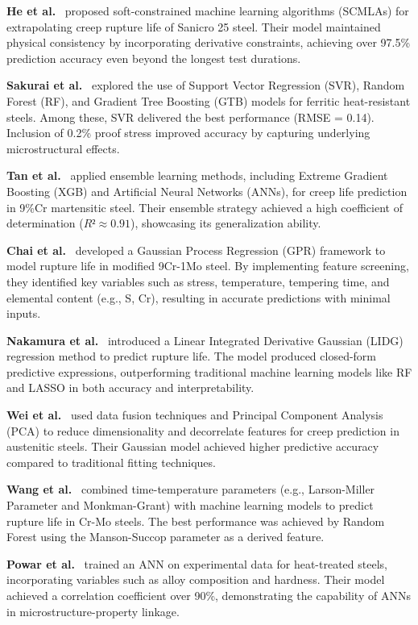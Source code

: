 \documentclass[class=scrbook, crop=false]{standalone}
\begin{document}
\textbf{He et al.}~\cite{he2023scmla} proposed soft-constrained machine learning algorithms (SCMLAs) for extrapolating creep rupture life of Sanicro 25 steel. Their model maintained physical consistency by incorporating derivative constraints, achieving over 97.5\% prediction accuracy even beyond the longest test durations.

\textbf{Sakurai et al.}~\cite{sakurai2023svr} explored the use of Support Vector Regression (SVR), Random Forest (RF), and Gradient Tree Boosting (GTB) models for ferritic heat-resistant steels. Among these, SVR delivered the best performance (RMSE = 0.14). Inclusion of 0.2\% proof stress improved accuracy by capturing underlying microstructural effects.

\textbf{Tan et al.}~\cite{tan2022xgb} applied ensemble learning methods, including Extreme Gradient Boosting (XGB) and Artificial Neural Networks (ANNs), for creep life prediction in 9\%Cr martensitic steel. Their ensemble strategy achieved a high coefficient of determination ($R² \approx 0.91$), showcasing its generalization ability.

\textbf{Chai et al.}~\cite{chai2023gpr} developed a Gaussian Process Regression (GPR) framework to model rupture life in modified 9Cr-1Mo steel. By implementing feature screening, they identified key variables such as stress, temperature, tempering time, and elemental content (e.g., S, Cr), resulting in accurate predictions with minimal inputs.

\textbf{Nakamura et al.}~\cite{nakamura2023lidg} introduced a Linear Integrated Derivative Gaussian (LIDG) regression method to predict rupture life. The model produced closed-form predictive expressions, outperforming traditional machine learning models like RF and LASSO in both accuracy and interpretability.

\textbf{Wei et al.}~\cite{wei2023fusion} used data fusion techniques and Principal Component Analysis (PCA) to reduce dimensionality and decorrelate features for creep prediction in austenitic steels. Their Gaussian model achieved higher predictive accuracy compared to traditional fitting techniques.

\textbf{Wang et al.}~\cite{wang2021msp} combined time-temperature parameters (e.g., Larson-Miller Parameter and Monkman-Grant) with machine learning models to predict rupture life in Cr-Mo steels. The best performance was achieved by Random Forest using the Manson-Succop parameter as a derived feature.

\textbf{Powar et al.}~\cite{powar2015ann} trained an ANN on experimental data for heat-treated steels, incorporating variables such as alloy composition and hardness. Their model achieved a correlation coefficient over 90\%, demonstrating the capability of ANNs in microstructure-property linkage.
\end{document}
